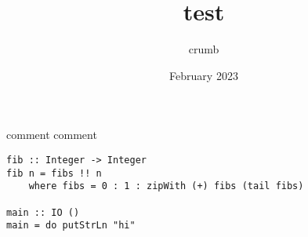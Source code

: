 \documentclass[12pt]{article}
\title{test}
\author{crumb }
\date{February 2023}
\begin{document}
\maketitle
comment comment
\begin{verbatim}
fib :: Integer -> Integer
fib n = fibs !! n
    where fibs = 0 : 1 : zipWith (+) fibs (tail fibs)

main :: IO ()
main = do putStrLn "hi"
\end{verbatim}
\end{document}
